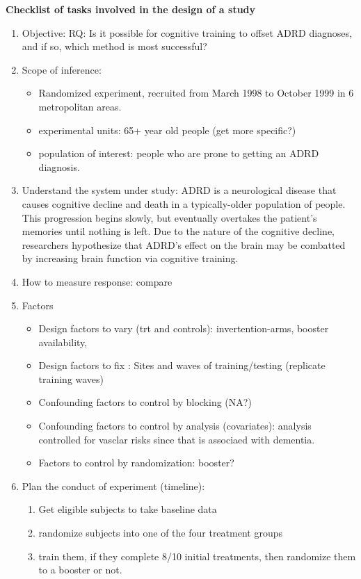 \documentclass[11pt]{article}
\begin{document}
\textbf{\textbf{Checklist of tasks involved in the design of a study}}
\begin{enumerate}
\item Objective: RQ: Is it possible for cognitive training to offset ADRD diagnoses, and if so, which method is most successful?
\item Scope of inference:
\begin{itemize}
\item Randomized experiment, recruited from March 1998 to October 1999 in 6 metropolitan areas.
\item experimental units: 65+ year old people (get more specific?)
\item population of interest: people who are prone to getting an ADRD diagnosis.
\end{itemize}
\item Understand the system under study: ADRD is a neurological disease that causes cognitive decline and death in a typically-older population of people. This progression begins slowly, but eventually overtakes the patient's memories until nothing is left. Due to the nature of the cognitive decline, researchers hypothesize that ADRD's effect on the brain may be combatted by increasing brain function via cognitive training.
\item How to measure response: compare
\item Factors
\begin{itemize}
\item Design factors to vary (trt and controls): invertention-arms, booster availability,
\item Design factors to fix : Sites and waves of training/testing (replicate training waves)
\item Confounding factors to control by blocking (NA?)
\item Confounding factors to control by analysis (covariates): analysis controlled for vasclar risks since that is associaed with dementia.
\item Factors to control by randomization: booster?
\end{itemize}
\item Plan the conduct of experiment (timeline):
\begin{enumerate}
\item Get eligible subjects to take baseline data
\item randomize subjects into one of the four treatment groups
\item train them, if they complete 8/10 initial treatments, then randomize them to a booster or not.

\end{enumerate}
\end{enumerate}
\end{document}
